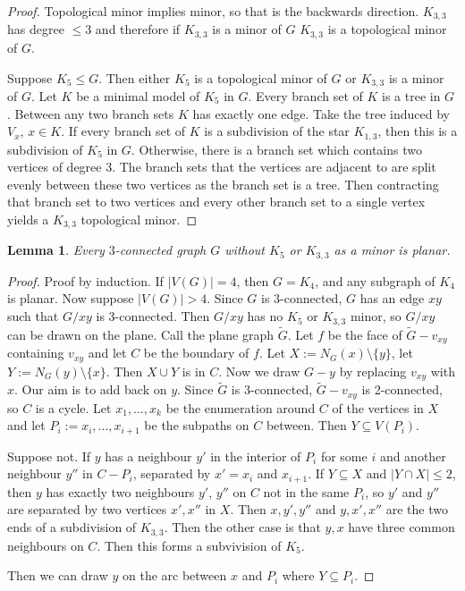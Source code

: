 \documentclass{article}
\newtheorem{lemma}[theorem]{Lemma}
\begin{document}
\begin{proof}
    Topological minor implies minor, so that is the backwards direction. 
    $K_{3,3}$ has degree $\leq 3$ and therefore if $K_{3,3}$ is a minor of $G$ $K_{3,3}$ is a topological minor of $G$.

    Suppose $K_5 \leq G$. Then either $K_5$ is a topological minor of $G$ or $K_{3,3}$ is a minor of $G$. Let $K$ be a minimal model of $K_5$ in $G$. Every branch set of $K$ is a tree in $G$. Between any two branch sets $K$ has exactly one edge. Take the tree induced by $V_x$, $x \in K$. If every branch set of $K$ is a subdivision of the star $K_{1,3}$, then this is a subdivision of $K_5$ in $G$. Otherwise, there is a branch set which contains two vertices of degree 3. The branch sets that the vertices are adjacent to are split evenly between these two vertices as the branch set is a tree. Then contracting that branch set to two vertices and every other branch set to a single vertex yields a $K_{3,3}$ topological minor.
\end{proof}

\begin{lemma}
    Every $3$-connected graph $G$ without $K_5$ or $K_{3,3}$ as a minor is planar. 
\end{lemma}

\begin{proof}
    Proof by induction. If $|V(G)| = 4$, then $G = K_4$, and any subgraph of $K_4$ is planar. Now suppose $|V(G)| > 4$. Since $G$ is $3$-connected, $G$ has an edge $xy$ such that $G/xy$ is $3$-connected. Then $G/xy$ has no $K_5$ or $K_{3,3}$ minor, so $G/{xy}$ can be drawn on the plane. Call the plane graph $\tilde{G}$. Let $f$ be the face of $\tilde{G} - v_{xy}$ containing $v_{xy}$ and let $C$ be the boundary of $f$. Let $X := N_G(x)\setminus \{y\}$, let $Y := N_G(y) \setminus \{x\}$. Then $X \cup Y$ is in $C$. Now we draw $G - y$ by replacing $v_{xy}$ with $x$. Our aim is to add back on $y$. Since $\tilde{G}$ is $3$-connected, $\tilde{G} - v_{xy}$ is 2-connected, so $C$ is a cycle. Let $x_1, \ldots, x_k$ be the enumeration around $C$ of the vertices in $X$ and let $P_i := x_i , \ldots , x_{i+1}$ be the subpaths on $C$ between. Then $Y \subseteq V(P_i)$. 

    Suppose not. If $y$ has a neighbour $y'$ in the interior of $P_i$ for some $i$ and another neighbour $y''$ in $C - P_i$, separated by $x' = x_i$ and $x_{i + 1}$. If $Y \subseteq X$ and $|Y \cap X| \leq 2$, then $y$ has exactly two neighbours $y'$, $y''$ on $C$ not in the same $P_i$, so $y'$ and $y''$ are separated by two vertices $x', x''$ in $X$. Then $x, y', y''$ and $y, x', x''$ are the two ends of a subdivision of $K_{3,3}$. Then the other case is that $y, x$ have three common neighbours on $C$. Then this forms a subvivision of $K_5$. 

    Then we can draw $y$ on the arc between $x$ and $P_i$ where $Y \subseteq P_i$. 
\end{proof}
\end{document}
